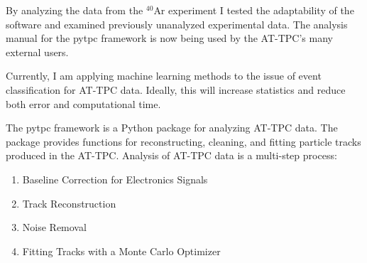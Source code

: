\documentclass[ansiepaperDNP,portrait]{baposterDNP}
\begin{document}
\begin{poster}
{\begin{minipage}{0.3\textwidth}
\end{minipage}
}
{\small{By analyzing the data from the $^{40}$Ar experiment I tested the adaptability of the software and examined previously unanalyzed experimental data. The analysis manual for the pytpc framework is now being used by the AT-TPC's many external users.

Currently, I am applying machine learning methods to the issue of event classification for AT-TPC data. Ideally, this will increase statistics and reduce both error and computational time.}
}

{\small{The pytpc framework is a Python package for analyzing AT-TPC data. The package provides functions for reconstructing, cleaning, and fitting particle tracks produced in the AT-TPC. Analysis of AT-TPC data is a multi-step process:

\begin{enumerate}\itemsep-0.04em
\item Baseline Correction for Electronics Signals
\item Track Reconstruction
\item Noise Removal
\item Fitting Tracks with a Monte Carlo Optimizer
\end{enumerate}

}}
\end{poster}
\end{document}
